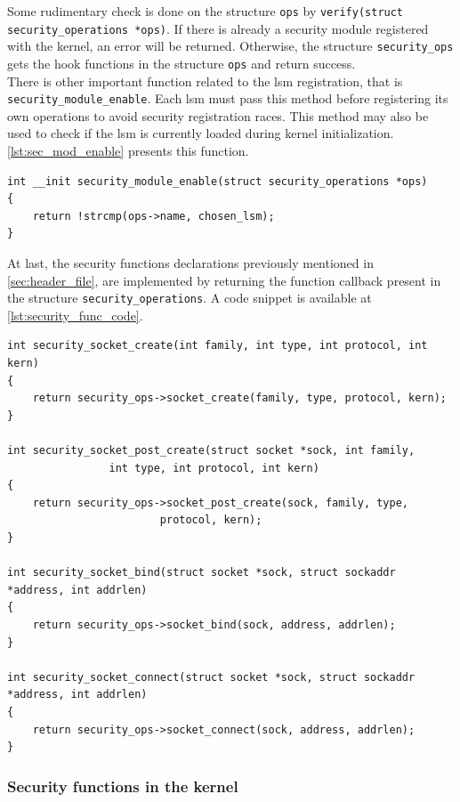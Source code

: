 Some rudimentary check is done on the structure \texttt{ops} by \texttt{verify(struct security\_operations *ops)}. If there is already a security module registered with the kernel, an error will be returned. Otherwise, the structure \texttt{security\_ops} gets the hook functions in the structure \texttt{ops} and return success.\\

There is other important function related to the \gls{lsm} registration, that is \texttt{security\_module\_enable}. Each \gls{lsm} must pass this method before registering its own operations to avoid security registration races. This method may also be used to check if the \gls{lsm} is currently loaded during kernel initialization. \autoref{lst:sec_mod_enable} presents this function.

\begin{lstlisting}[style=CInputStyle, caption=\texttt{register\_security} function (Linux kernel v3.11), label=lst:sec_mod_enable]
int __init security_module_enable(struct security_operations *ops)
{
	return !strcmp(ops->name, chosen_lsm);
}
\end{lstlisting}

At last, the security functions declarations previously mentioned in \autoref{sec:header_file}, are implemented by returning the function callback present in the structure \texttt{security\_operations}. A code snippet is available at \autoref{lst:security_func_code}.

\begin{lstlisting}[style=CInputStyle, caption=\texttt{register\_security} function (Linux kernel v3.11), label=lst:security_func_code]
int security_socket_create(int family, int type, int protocol, int kern)
{
	return security_ops->socket_create(family, type, protocol, kern);
}

int security_socket_post_create(struct socket *sock, int family,
				int type, int protocol, int kern)
{
	return security_ops->socket_post_create(sock, family, type,
						protocol, kern);
}

int security_socket_bind(struct socket *sock, struct sockaddr *address, int addrlen)
{
	return security_ops->socket_bind(sock, address, addrlen);
}

int security_socket_connect(struct socket *sock, struct sockaddr *address, int addrlen)
{
	return security_ops->socket_connect(sock, address, addrlen);
}
\end{lstlisting}

\subsubsection{Security functions in the kernel}
\label{sec:security_func}

